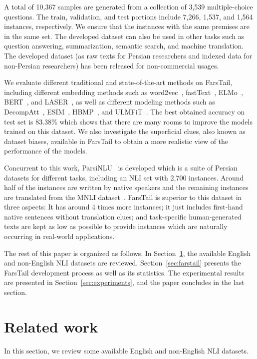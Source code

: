 \documentclass[preprint,12pt]{elsarticle}
\begin{document}
A total of 10,367 samples are generated from a collection of 3,539 multiple-choice questions. The train, validation, and test portions include 7,266, 1,537, and 1,564 instances, respectively. We ensure that the instances with the same premises are in the same set. The developed dataset can also be used in other tasks such as question answering, summarization, semantic search, and machine translation. The developed dataset (as raw texts for Persian researchers and indexed data for non-Persian researchers) has been released for non-commercial usages. 

We evaluate different traditional and state-of-the-art methods on FarsTail, including different embedding methods such as word2vec~\citep{mikolov2013distributed}, fastText~\citep{bojanowski2017enriching}, ELMo~\citep{peters2018deep}, BERT~\citep{devlin2018bert}, and LASER~\citep{artetxe2019massively}, as well as different modeling methods such as DecompAtt~\citep{parikh2016decomposable}, ESIM~\citep{chen2016enhanced}, HBMP~\citep{talman2019sentence}, and ULMFiT~\citep{howard2018universal}. 
The best obtained accuracy on test set is 83.38\% which shows that there are many rooms to improve the models trained on this dataset. We also investigate the superficial clues, also known as dataset biases, available in FarsTail to obtain a more realistic view of the performance of the models.



Concurrent to this work, ParsiNLU~\citep{khashabi2020parsinlu} is developed which is a suite of Persian datasets for different tasks, including an NLI set with 2,700 instances. Around half of the instances are written by native speakers and the remaining instances are translated from the MNLI dataset~\citep{williams2017broad}. FarsTail is superior to this dataset in three aspects: It has around 4 times more instances; it just includes first-hand native sentences without translation clues; and task-specific human-generated texts are kept as low as possible to provide instances which are naturally occurring in real-world applications.

The rest of this paper is organized as follows. In Section~\ref{sec:literature}, the available English and non-English NLI datasets are reviewed. Section~\ref{sec:farstail} presents the FarsTail development process as well as its statistics. The experimental results are presented in Section~\ref{sec:experiments}, and the paper concludes in the last section. 

\section{Related work}
\label{sec:literature}
In this section, we review some available English and non-English NLI datasets. 
\end{document}
